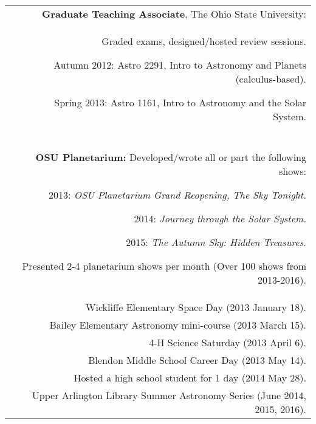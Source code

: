 \documentclass[letterpaper,12pt]{article}
\begin{document}
\begin{longtable}{LR}
\underline{} &  
\textbf{Graduate Teaching Associate}, The Ohio State University:\\
\underline{}&  Graded exams, designed/hosted review sessions.
\begin{compactitem}
\item Autumn 2012: \hspace{2mm}Astro 2291,  Intro to Astronomy and Planets (calculus-based).
\item Spring 2013: \hspace{4.8mm}Astro 1161,  Intro to Astronomy and the Solar System.
\end{compactitem}
\\




\underline{}\\\underline{} 
&\textbf{OSU Planetarium:} Developed/wrote all or part the following shows:
\begin{compactitem}
\item 2013:  \textit{OSU Planetarium Grand Reopening, The Sky Tonight.}
\item 2014:  \textit{Journey through the Solar System.}
\item 2015:  \textit{The Autumn Sky:  Hidden Treasures.}
\end{compactitem}
\noindent Presented 2-4 planetarium shows per month (Over 100 shows from 2013-2016).\\
&Wickliffe Elementary Space Day (2013 January 18).\\
&Bailey Elementary Astronomy mini-course (2013 March 15).\\
&4-H Science Saturday (2013 April 6).\\
&Blendon Middle School Career Day (2013 May 14).\\
&Hosted a high school student for 1 day (2014 May 28).\\
&Upper Arlington Library Summer Astronomy Series (June 2014, 2015, 2016).\\

\end{longtable}
\end{document}
